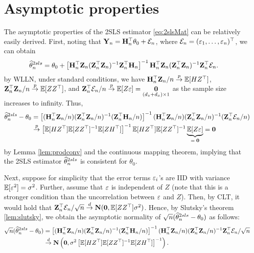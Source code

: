 \documentclass[11pt, A4paper, openany, uplatex]{book}
\begin{document}
\section{Asymptotic properties}\label{sec:2slsAsymptotics}

The asymptotic properties of the 2SLS estimator \eqref{eq:2slsMat} can be relatively easily derived.
First, noting that $\mathbf{Y}_n = \mathbf{H}_n^\top\theta_0 + \mathcal{E}_n$, where $\mathcal{E}_n = (\varepsilon_1, \ldots , \varepsilon_n)^\top$, we can obtain
\begin{align*}
	\widehat \theta_n^{2sls} 
	& = \theta_0 + \left[\mathbf{H}_n^\top \mathbf{Z}_n(\mathbf{Z}_n^\top \mathbf{Z}_n)^{-1}\mathbf{Z}_n^\top \mathbf{H}_n  \right]^{-1}\mathbf{H}_n^\top \mathbf{Z}_n(\mathbf{Z}_n^\top \mathbf{Z}_n)^{-1}\mathbf{Z}_n^\top\mathcal{E}_n.
\end{align*}
by WLLN, under standard conditions, we have $\mathbf{H}_n^\top \mathbf{Z}_n/n \overset{p}{\to} \mathbb{E}[H Z^\top]$,  $\mathbf{Z}_n^\top \mathbf{Z}_n/n \overset{p}{\to} \mathbb{E}[Z Z^\top]$, and  $\mathbf{Z}_n^\top \mathcal{E}_n/n \overset{p}{\to} \mathbb{E}[Z \varepsilon] = \underset{(d_z + d_x)\times 1}{\mathbf{0}}$ as the sample size increases to infinity.
Thus,
\begin{align*}	
	\widehat \theta_n^{2sls} - \theta_0
	& = \left[(\mathbf{H}_n^\top \mathbf{Z}_n/n)(\mathbf{Z}_n^\top \mathbf{Z}_n/n)^{-1}(\mathbf{Z}_n^\top \mathbf{H}_n/n ) \right]^{-1}(\mathbf{H}_n^\top \mathbf{Z}_n/n)(\mathbf{Z}_n^\top \mathbf{Z}_n/n)^{-1}(\mathbf{Z}_n^\top\mathcal{E}_n/n) \\
	& \overset{p}{\to} \left[ \mathbb{E}[H Z^\top] \mathbb{E}[Z Z^\top]^{-1} \mathbb{E}[Z H^\top] \right]^{-1} \mathbb{E}[H Z^\top] \mathbb{E}[Z Z^\top]^{-1} \underbrace{\mathbb{E}[Z \varepsilon]}_{= \; \mathbf{0}} = \mathbf{0}
\end{align*}
by Lemma \ref{lem:prodconv} and the continuous mapping theorem, implying that the 2SLS estimator $\widehat \theta_n^{2sls}$ is consistent for $\theta_0$.

Next, suppose for simplicity that the error terms $\varepsilon_i$'s are IID with variance $\mathbb{E}[\varepsilon^2] = \sigma^2$.
Further, assume that $\varepsilon$ is independent of $Z$ (note that this is a stronger condition than the uncorrelation between $\varepsilon$ and $Z$).
Then, by CLT, it would hold that $\mathbf{Z}_n^\top\mathcal{E}_n/\sqrt{n} \overset{d}{\to} \mathbf{N}(\mathbf{0}, \mathbb{E}[Z Z^\top]\sigma^2)$.
Hence, by Slutsky's theorem \ref{lem:slutsky}, we obtain the asymptotic normality of $\sqrt{n}(\widehat \theta_n^{2sls} - \theta_0)$ as follows:
\begin{align*}
	\sqrt{n}(\widehat \theta_n^{2sls} - \theta_0) 
	& = \left[(\mathbf{H}_n^\top \mathbf{Z}_n/n)(\mathbf{Z}_n^\top \mathbf{Z}_n/n)^{-1}(\mathbf{Z}_n^\top \mathbf{H}_n/n ) \right]^{-1}(\mathbf{H}_n^\top \mathbf{Z}_n/n)(\mathbf{Z}_n^\top \mathbf{Z}_n/n)^{-1}\mathbf{Z}_n^\top\mathcal{E}_n/\sqrt{n} \\
	& \overset{d}{\to} \mathbf{N}\left(\mathbf{0}, \sigma^2  \left[ \mathbb{E}[H Z^\top] \mathbb{E}[Z Z^\top]^{-1} \mathbb{E}[Z H^\top] \right]^{-1}\right).
\end{align*}
\end{document}
